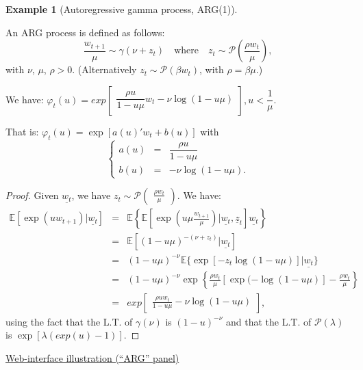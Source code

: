 \documentclass[
  12pt,
]{book}
\theoremstyle{definition}
\theoremstyle{definition}
\newtheorem{example}{Example}[chapter]
\theoremstyle{definition}
\theoremstyle{definition}
\theoremstyle{remark}
\begin{document}
\begin{example}[Autoregressive gamma process, ARG(1)]
\protect\hypertarget{exm:ARG1}{}\label{exm:ARG1}

An ARG process is defined as follows:
\[
\frac{w_{t+1}}{\mu} \sim \gamma(\nu+z_t) \quad \mbox{where} \quad z_t \sim \mathcal{P} \left( \frac{\rho w_t}{\mu} \right),
\]
with \(\nu\), \(\mu\), \(\rho > 0\). (Alternatively \(z_t \sim {\mathcal{P}}(\beta w_t)\), with \(\rho = \beta \mu\).)

We have:
\(\varphi_t(u) = exp \left[ \begin{array}{l}  \dfrac{\rho u}{1-u \mu} w_t - \nu \log(1-u \mu)\end{array} \right], u < \dfrac{1}{\mu}\).

That is: \(\varphi_t(u) = \exp[a(u)'w_t+b(u)]\) with
\[
\left\{
\begin{array}{ccc}
a(u) &=&  \dfrac{\rho u}{1-u \mu}\\
b(u) &=& -\nu  
\log(1-u \mu).
\end{array}
\right.
\]

\begin{proof}
Given \(\underline{w_t}\), we have \(z_t \sim {\mathcal P}\left( \begin{array}{l} \frac{\rho w_t} {\mu} \end{array}\right)\). We have:
\begin{eqnarray*}
\mathbb{E}[\exp(u w_{t+1})|\underline{w_t}] &=& \mathbb{E}\left\{\mathbb{E}\left[\exp \left(u \mu  \frac{w_{t+1}}{\mu}\right)|\underline{w_t}, \underline{z}_t\right]\underline{w_t}\right\}\\
&=& \mathbb{E}[(1-u\mu)^{-(\nu+z_t)}|\underline{w_t}] \\
&=& (1-u\mu)^{-\nu}\mathbb{E}\{\exp[-z_t   \log(1-u\mu)]|\underline{w_t}\} \\
&=& (1-u\mu)^{-\nu} \exp \left\{\frac{\rho w_t}{\mu}[\exp(-\log(1-u\mu)] -  \frac{\rho w_t}{\mu}\right\}\\
&=& exp\left[ \begin{array}{l}  \frac{\rho u w_t}{1-u\mu} - \nu   \log(1-u\mu)  \end{array}\right],
\end{eqnarray*}
using the fact that the L.T. of \(\gamma(\nu)\) is \((1-u)^{-\nu}\)
and that the L.T. of \({\mathcal P}(\lambda)\) is \(\exp[\lambda(exp(u)-1)]\).
\end{proof}

\href{https://jrenne.shinyapps.io/Affine/}{Web-interface illustration (``ARG'' panel)}


\end{example}
\end{document}
